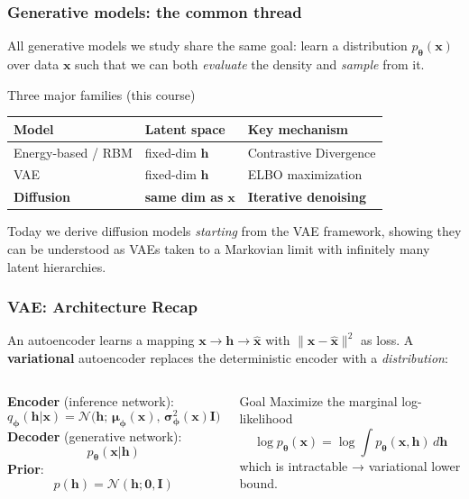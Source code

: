 \documentclass{beamer}
\newcommand{\Norm}{\mathcal{N}}
\begin{document}
\begin{frame}
\frametitle{Generative models: the common thread}

All generative models we study share the same goal: learn a distribution
$p_{\bm{\theta}}(\bm{x})$ over data $\bm{x}$ such that we can both
\emph{evaluate} the density and \emph{sample} from it.

\begin{block}{Three major families (this course)}
\begin{tabular}{lll}
\toprule
\textbf{Model} & \textbf{Latent space} & \textbf{Key mechanism} \\
\midrule
Energy-based / RBM & fixed-dim $\bm{h}$ & Contrastive Divergence \\
VAE & fixed-dim $\bm{h}$ & ELBO maximization \\
\textbf{Diffusion} & \textbf{same dim as} $\bm{x}$ & \textbf{Iterative denoising} \\
\bottomrule
\end{tabular}
\end{block}

\vspace{2mm}
Today we derive diffusion models \emph{starting} from the VAE framework,
showing they can be understood as VAEs taken to a Markovian limit with
infinitely many latent hierarchies.
\end{frame}

\begin{frame}
\frametitle{VAE: Architecture Recap}

An autoencoder learns a mapping $\bm{x}\to\bm{h}\to\hat{\bm{x}}$ with
$\|\bm{x}-\hat{\bm{x}}\|^2$ as loss.  A \textbf{variational} autoencoder
replaces the deterministic encoder with a \emph{distribution}:

\begin{columns}
\textbf{Encoder} (inference network):
\[
  q_{\bm{\phi}}(\bm{h}|\bm{x})
  = \Norm\!\bigl(\bm{h};\,\bm{\mu}_{\bm{\phi}}(\bm{x}),\,
    \bm{\sigma}^2_{\bm{\phi}}(\bm{x})\mathbf{I}\bigr)
\]
\textbf{Decoder} (generative network):
\[
  p_{\bm{\theta}}(\bm{x}|\bm{h})
\]
\textbf{Prior}:
\[
  p(\bm{h}) = \Norm(\bm{h};\bm{0},\mathbf{I})
\]
\begin{block}{Goal}
Maximize the marginal log-likelihood
\[
  \log p_{\bm{\theta}}(\bm{x}) = \log\!\int p_{\bm{\theta}}(\bm{x},\bm{h})\,d\bm{h}
\]
which is intractable → variational lower bound.
\end{block}
\end{columns}
\end{frame}
\end{document}

